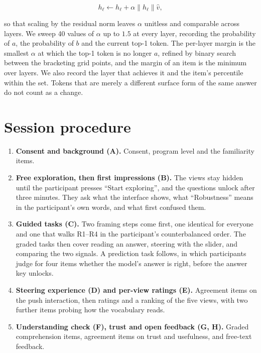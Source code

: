 \documentclass[sigconf]{acmart}
\begin{document}
\begin{equation}
  h_\ell \leftarrow h_\ell + \alpha \lVert h_\ell \rVert \hat{v},
\end{equation}

so that scaling by the residual norm leaves $\alpha$ unitless and comparable across layers. We sweep 40 values
of $\alpha$ up to $1.5$ at every layer, recording the probability of $a$, the probability of $b$ and the
current top-1 token. The per-layer margin is the smallest $\alpha$ at which the top-1 token is no longer $a$,
refined by binary search between the bracketing grid points, and the margin of an item is the minimum over
layers. We also record the layer that achieves it and the item's percentile within the set. Tokens that are
merely a different surface form of the same answer do not count as a change.

\section{Session procedure}
\label{app:procedure}

\begin{enumerate}
  \item \textbf{Consent and background (A).} Consent, program level and the familiarity items.
  \item \textbf{Free exploration, then first impressions (B).} The views stay hidden until the participant
    presses ``Start exploring'', and the questions unlock after three minutes. They ask what the interface
    shows, what ``Robustness'' means in the participant's own words, and what first confused them.
  \item \textbf{Guided tasks (C).} Two framing steps come first, one identical for everyone and one that walks
    R1--R4 in the participant's counterbalanced order. The graded tasks then cover reading an answer, steering
    with the slider, and comparing the two signals. A prediction task follows, in which participants judge for
    four items whether the model's answer is right, before the answer key unlocks.
  \item \textbf{Steering experience (D) and per-view ratings (E).} Agreement items on the push interaction,
    then ratings and a ranking of the five views, with two further items probing how the vocabulary reads.
  \item \textbf{Understanding check (F), trust and open feedback (G, H).} Graded comprehension items, agreement
    items on trust and usefulness, and free-text feedback.
\end{enumerate}
\end{document}
